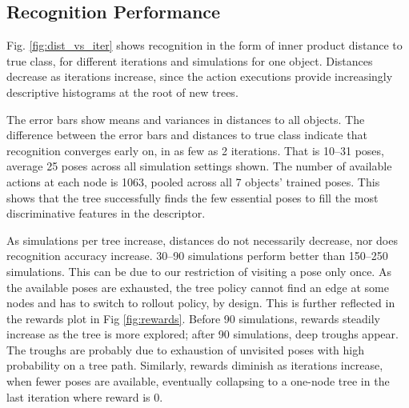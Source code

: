\documentclass[letterpaper, 10 pt, conference]{ieeeconf}  %
\newcommand{\red}[1]{\textcolor{red}{#1}}
\begin{document}



\subsection{Recognition Performance}

Fig. \ref{fig:dist_vs_iter} shows recognition in the form of inner product distance to true class, for different iterations and simulations for one object. Distances decrease as iterations increase, since the action executions provide increasingly descriptive histograms at the root of new trees.

The error bars show means and variances in distances to all objects. The difference between the error bars and distances to true class indicate that recognition converges early on, in as few as 2 iterations. That is 10--31 poses, average 25 poses across all simulation settings shown. The number of available actions at each node is 1063, pooled across all 7 objects' trained poses. This shows that the tree successfully finds the few essential poses to fill the most discriminative features in the descriptor.

As simulations per tree increase, distances do not necessarily decrease, nor does recognition accuracy increase. 30--90 simulations perform better than 150--250 simulations. This can be due to our restriction of visiting a pose only once. As the available poses are exhausted, the tree policy cannot find an edge at some nodes and has to switch to rollout policy, by design.
%
This is further reflected in the rewards plot in Fig \ref{fig:rewards}. Before 90 simulations, rewards steadily increase as the tree is more explored; after 90 simulations, deep troughs appear. The troughs are probably due to exhaustion of unvisited poses with high probability on a tree path. Similarly, rewards diminish as iterations increase, when fewer poses are available, %
eventually collapsing to a one-node tree in the last iteration where reward is 0.
\end{document}

